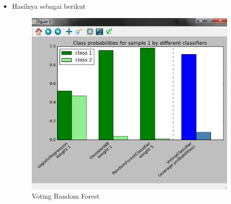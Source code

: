 \begin{itemize}
\begin{verbatim}
# plot annotations
plt.axvline(2.8, color='k', linestyle='dashed')
ax.set_xticks(ind + width)
ax.set_xticklabels(['LogisticRegression\nweight 1',
                    'GaussianNB\nweight 1',
                    'RandomForestClassifier\nweight 5',
                    'VotingClassifier\n(average probabilities)'],
                   rotation=40,
                   ha='right')
plt.ylim([0, 1])
plt.title('Class probabilities for sample 1 by different classifiers')
plt.legend([p1[0], p2[0]], ['class 1', 'class 2'], loc='upper left')
plt.tight_layout()
plt.show()
\end{verbatim}
\item
Hasilnya sebagai berikut 
\begin{figure}[ht]
\centering
\includegraphics[scale=0.5]{figures/teori6.png}
\caption{Voting Random Forest}
\label{Contoh}
\end{figure}
\end{itemize}

\documentclass{article}
\usepackage[utf8]{inputenc}


\usepackage{natbib}
\usepackage{graphicx}
\usepackage{listings}



\section{Annisa Cahyani/1164066}
